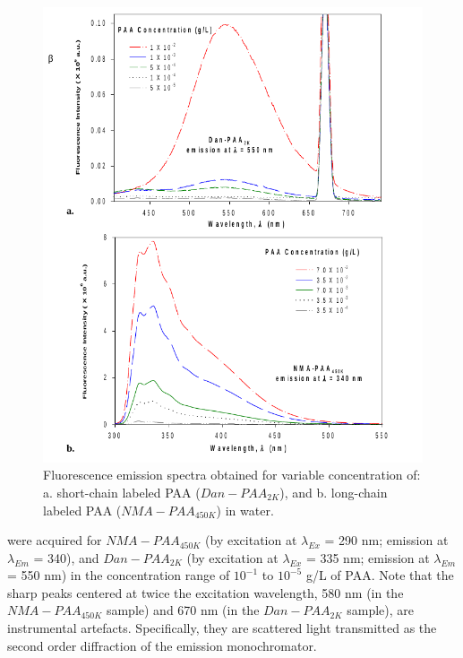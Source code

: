 \documentclass[journal=mamobx,manuscript=article]{achemso}
\begin{document}
\begin{figure}[H]
\includegraphics[scale=0.5]{fig2.png}
\caption{Fluorescence emission spectra obtained for variable concentration of: a. short-chain labeled PAA ($Dan-PAA_{2K}$), and b. long-chain labeled PAA ($NMA-PAA_{450K}$) in water.}
\label{figure 2}
\end{figure}

were acquired for $NMA-PAA_{450K}$ (by excitation at $\lambda_{Ex}$ = 290 nm; emission at $\lambda_{Em}$ = 340),\cite{Anghel1998} and $Dan-PAA_{2K}$ (by excitation at $\lambda_{Ex}$ = 335 nm; emission at $\lambda_{Em}$ = 550 nm)\cite{Bednar1985} in the concentration range of $10^{-1}$ to $10^{-5}$ g/L of PAA.  Note that the sharp peaks centered at twice the excitation wavelength, 580 nm (in the $NMA-PAA_{450K}$ sample) and 670 nm (in the $Dan-PAA_{2K}$ sample), are instrumental artefacts.  Specifically, they are scattered light transmitted as the second order diffraction of the emission monochromator. 
\end{document}
